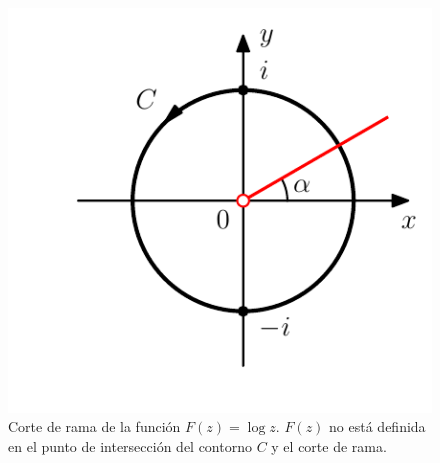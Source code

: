 \documentclass[a4paper]{report}
\begin{document}
\begin{figure}[!htb]
  \begin{minipage}[c]{0.35\textwidth}
    \includegraphics[width=\textwidth]{figuras/example_48_03_C.pdf}
  \end{minipage}\hfill
  \begin{minipage}[c]{0.55\textwidth}
    \caption{
        Corte de rama de la función \(F(z)=\log z\). \(F(z)\) no está definida en el punto de intersección del contorno \(C\) y el corte de rama.
    }\label{fig:example_48_03_C}
  \end{minipage}
\end{figure}
\end{document}
